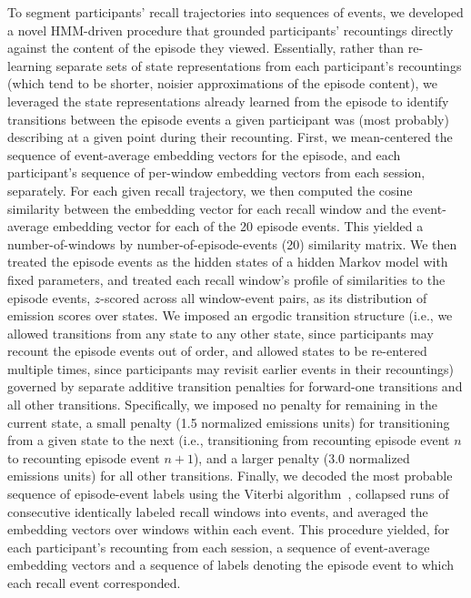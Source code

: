\documentclass[10pt]{article}
\begin{document}
To segment participants' recall trajectories into sequences of events, we developed a novel HMM-driven procedure that grounded participants' recountings directly against the content of the episode they viewed.
Essentially, rather than re-learning separate sets of state representations from each participant's recountings (which tend to be shorter, noisier approximations of the episode content), we leveraged the state representations already learned from the episode to identify transitions between the episode events a given participant was (most probably) describing at a given point during their recounting.
First, we mean-centered the sequence of event-average embedding vectors for the episode, and each participant's sequence of per-window embedding vectors from each session, separately.
For each given recall trajectory, we then computed the cosine similarity between the embedding vector for each recall window and the event-average embedding vector for each of the 20 episode events.
This yielded a number-of-windows by number-of-episode-events (20) similarity matrix.
We then treated the episode events as the hidden states of a hidden Markov model with fixed parameters, and treated each recall window's profile of similarities to the episode events, $z$-scored across all window-event pairs, as its distribution of emission scores over states.
We imposed an ergodic transition structure (i.e., we allowed transitions from any state to any other state, since participants may recount the episode events out of order, and allowed states to be re-entered multiple times, since participants may revisit earlier events in their recountings) governed by separate additive transition penalties for forward-one transitions and all other transitions.
Specifically, we imposed no penalty for remaining in the current state, a small penalty (1.5 normalized emissions units) for transitioning from a given state to the next (i.e., transitioning from recounting episode event $n$ to recounting episode event $n + 1$), and a larger penalty (3.0 normalized emissions units) for all other transitions.
Finally, we decoded the most probable sequence of episode-event labels using the Viterbi algorithm~\citep{Vite67}, collapsed runs of consecutive identically labeled recall windows into events, and averaged the embedding vectors over windows within each event.
This procedure yielded, for each participant's recounting from each session, a sequence of event-average embedding vectors and a sequence of labels denoting the episode event to which each recall event corresponded.
\end{document}
